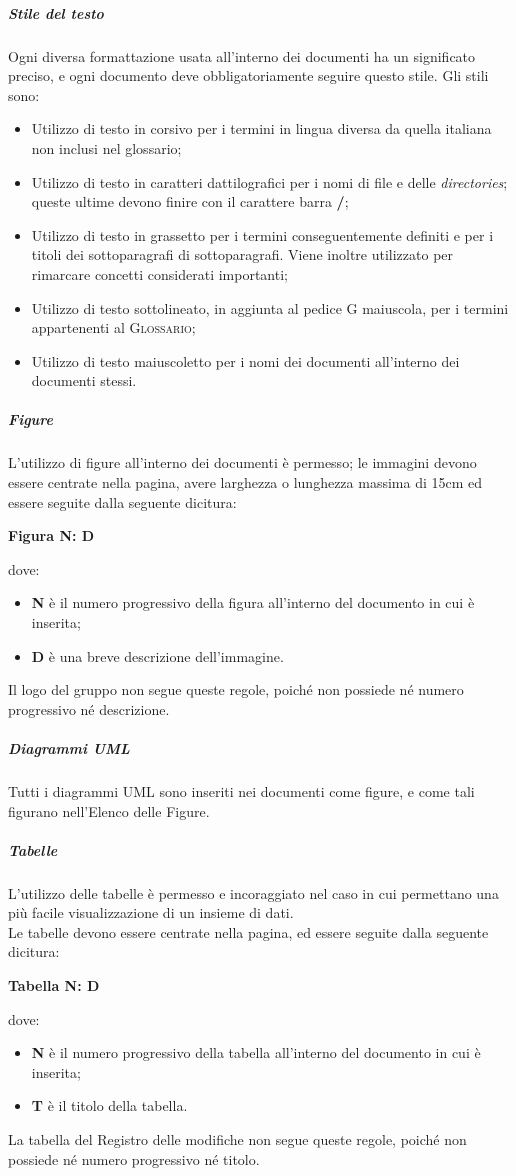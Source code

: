\documentclass[../norme-di-progetto.tex]{subfiles}
\begin{document}
\subparagraph*{Stile del testo}
Ogni diversa formattazione usata all'interno dei documenti ha un significato preciso, e ogni documento deve obbligatoriamente seguire questo stile. Gli stili sono:
\begin{itemize}
  \item Utilizzo di testo in corsivo per i termini in lingua diversa da quella italiana non inclusi nel glossario;
  \item Utilizzo di testo in caratteri dattilografici per i nomi di file e delle \textit{directories}; queste ultime devono finire con il carattere barra \textbf{/};
  \item Utilizzo di testo in grassetto per i termini conseguentemente definiti e per i titoli dei sottoparagrafi di sottoparagrafi. Viene inoltre utilizzato per rimarcare concetti considerati importanti;
  \item Utilizzo di testo sottolineato, in aggiunta al pedice G maiuscola, per i termini appartenenti al \textsc{Glossario};
  \item Utilizzo di testo maiuscoletto per i nomi dei documenti all'interno dei documenti stessi.
\end{itemize}

\subparagraph*{Figure}
L'utilizzo di figure all'interno dei documenti è permesso; le immagini devono essere centrate nella pagina, avere larghezza o lunghezza massima di 15cm ed essere seguite dalla seguente dicitura: \\ \begin{center}
  \centering
  \textbf{Figura N: D}
\end{center} dove:
\begin{itemize}
  \item \textbf{N} è il numero progressivo della figura all'interno del documento in cui è inserita;
  \item \textbf{D} è una breve descrizione dell'immagine.
\end{itemize}
Il logo del gruppo non segue queste regole, poiché non possiede né numero progressivo né descrizione.

\subparagraph*{Diagrammi UML}
Tutti i diagrammi UML sono inseriti nei documenti come figure, e come tali figurano nell'Elenco delle Figure.

\subparagraph*{Tabelle}
L'utilizzo delle tabelle è permesso e incoraggiato nel caso in cui permettano una più facile visualizzazione di un insieme di dati. \\
Le tabelle devono essere centrate nella pagina, ed essere seguite dalla seguente dicitura: \\ \begin{center}
  \centering
  \textbf{Tabella N: D}
\end{center} dove:
\begin{itemize}
  \item \textbf{N} è il numero progressivo della tabella all'interno del documento in cui è inserita;
  \item \textbf{T} è il titolo della tabella.
\end{itemize}
La tabella del Registro delle modifiche non segue queste regole, poiché non possiede né numero progressivo né titolo.
\end{document}
